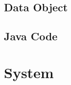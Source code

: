 \documentclass{article}
\begin{document}
\subsection{Data Object}



\newpage

\subsection{Java Code}


\begin{comment}
\noindent
\begin{alert}
There have been a few changes to the $List$ class when working towards a `final' implementation.
\begin{enumerate}
  \item There was a bug in the \code{insert(int value)} method which did not set \code{node.next.empty} to \code{true} when the next element had already been allocated.

  \item The previous \code{void insert(int value)} did not do the full job of clearing the list when it reaches 50 elements, and only inserting the value if it is not already contained in the list. I thus renamed \code{void insert(int value)} into \code{void append(int value)} and let the new \code{void insert(int value)} method do the entire job.

  \item A private synchronized method \code{boolean contains(int value)} has been added to facilitate implementation of \code{insert(int value)}.

  \item Setting \code{next} to \code{null} in the constructor. Strictly, this may not be necessary though.
\end{enumerate}
\end{alert}
\end{comment}

\begin{comment}
\begin{note}
  Andy Wellings now seems to fully agrees with the code now. \smiley
\end{note}
\end{comment}

\newpage


\section{System}

\begin{circusbox}

\end{circusbox}
\end{document}
